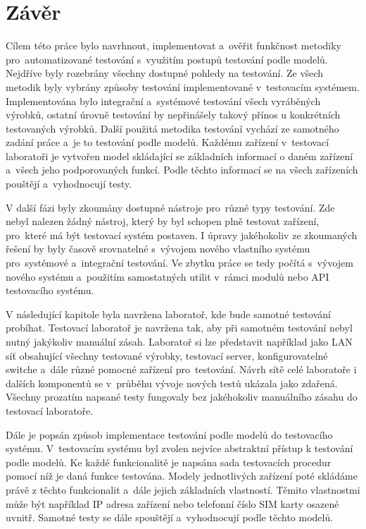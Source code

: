 \chapter{Závěr}
Cílem této práce bylo navrhnout, implementovat a~ověřit funkčnost metodiky pro~automatizované testování s~využitím postupů testování podle modelů. Nejdříve byly rozebrány všechny dostupné pohledy na testování. Ze všech metodik byly vybrány způsoby testování implementované v~testovacím systémem. Implementována bylo integrační a~systémové testování všech vyráběných výrobků, ostatní úrovně testování by nepřinášely takový přínos u konkrétních testovaných výrobků. Další použitá metodika testování vychází ze samotného zadání práce a~je to testování podle modelů. Každému zařízení v~testovací laboratoři je vytvořen model skládající se základních informací o daném zařízení a~všech jeho podporovaných funkcí. Podle těchto informací se na všech zařízeních pouštějí a~vyhodnocují testy.

V další fázi byly zkoumány dostupné nástroje pro~různé typy testování. Zde nebyl nalezen žádný nástroj, který by byl schopen plně testovat zařízení, pro~které má být testovací systém postaven. I úpravy jakéhokoliv ze zkoumaných řešení by byly časově srovnatelné s~vývojem nového vlastního systému pro~systémové a~integrační testování. Ve zbytku práce se tedy počítá s~vývojem nového systému a~použitím samostatných utilit v~rámci modulů nebo API testovacího systému.

V následující kapitole byla navržena laboratoř, kde bude samotné testování probíhat. Testovací laboratoř je navržena tak, aby při samotném testování nebyl nutný jakýkoliv manuální zásah. Laboratoř si lze představit například jako LAN síť obsahující všechny testované výrobky, testovací server, konfigurovatelné switche a~dále různé pomocné zařízení pro~testování. Návrh sítě celé laboratoře i dalších komponentů se v~průběhu vývoje nových testů ukázala jako zdařená. Všechny prozatím napsané testy fungovaly bez jakéhokoliv manuálního zásahu do testovací laboratoře.

Dále je popsán způsob implementace testování podle modelů do testovacího systému. V~testovacím systému byl zvolen nejvíce abstraktní přístup k testování podle modelů. Ke každé funkcionalitě je napsána sada testovacích procedur pomocí níž je daná funkce testována. Modely jednotlivých zařízení poté skládáme právě z těchto funkcionalit a~dále jejich základních vlastností. Těmito vlastnostmi může být například IP adresa zařízení nebo telefonní číslo SIM karty osazené uvnitř. Samotné testy se dále spouštějí a~vyhodnocují podle těchto modelů.

